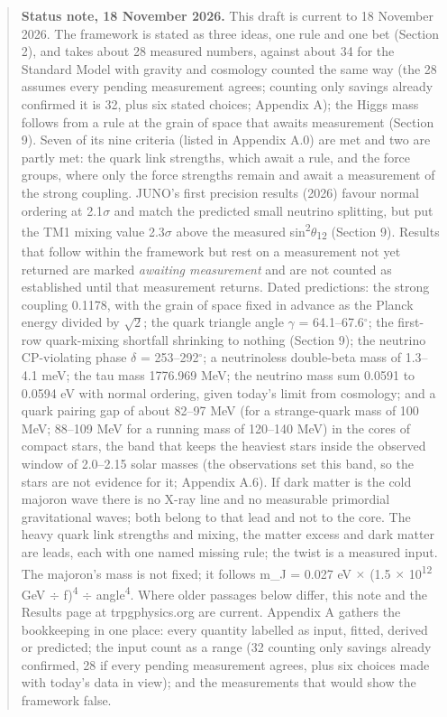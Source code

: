 \documentclass[
  11pt,
]{article}
\begin{document}
\begin{quote}
\textbf{Status note, 18 November 2026.} This draft is current to 18 November 2026. The framework is stated as three ideas, one rule and one bet (Section 2), and takes about 28 measured numbers, against about 34 for the Standard Model with gravity and cosmology counted the same way (the 28 assumes every pending measurement agrees; counting only savings already confirmed it is 32, plus six stated choices; Appendix A); the Higgs mass follows from a rule at the grain of space that awaits measurement (Section 9). Seven of its nine criteria (listed in Appendix A.0) are met and two are partly met: the quark link strengths, which await a rule, and the force groups, where only the force strengths remain and await a measurement of the strong coupling. JUNO's first precision results (2026) favour normal ordering at 2.1\ensuremath{\sigma} and match the predicted small neutrino splitting, but put the TM1 mixing value 2.3\ensuremath{\sigma} above the measured sin\textsuperscript{2}\ensuremath{\theta}\textsubscript{12} (Section 9). Results that follow within the framework but rest on a measurement not yet returned are marked \emph{awaiting measurement} and are not counted as established until that measurement returns. Dated predictions: the strong coupling 0.1178, with the grain of space fixed in advance as the Planck energy divided by \ensuremath{\sqrt{2}}; the quark triangle angle \ensuremath{\gamma} = 64.1--67.6\ensuremath{^\circ}; the first-row quark-mixing shortfall shrinking to nothing (Section 9); the neutrino CP-violating phase \ensuremath{\delta} = 253--292\ensuremath{^\circ}; a neutrinoless double-beta mass of 1.3--4.1 meV; the tau mass 1776.969 MeV; the neutrino mass sum 0.0591 to 0.0594 eV with normal ordering, given today's limit from cosmology; and a quark pairing gap of about 82--97 MeV (for a strange-quark mass of 100 MeV; 88--109 MeV for a running mass of 120--140 MeV) in the cores of compact stars, the band that keeps the heaviest stars inside the observed window of 2.0--2.15 solar masses (the observations set this band, so the stars are not evidence for it; Appendix A.6). If dark matter is the cold majoron wave there is no X-ray line and no measurable primordial gravitational waves; both belong to that lead and not to the core. The heavy quark link strengths and mixing, the matter excess and dark matter are leads, each with one named missing rule; the twist is a measured input. The majoron's mass is not fixed; it follows m\_J = 0.027 eV \ensuremath{\times} (1.5 \ensuremath{\times} 10\textsuperscript{12} GeV \ensuremath{\div} f)\textsuperscript{4} \ensuremath{\div} angle\textsuperscript{4}. Where older passages below differ, this note and the Results page at trpgphysics.org are current. Appendix A gathers the bookkeeping in one place: every quantity labelled as input, fitted, derived or predicted; the input count as a range (32 counting only savings already confirmed, 28 if every pending measurement agrees, plus six choices made with today's data in view); and the measurements that would show the framework false.
\end{quote}
\end{document}
